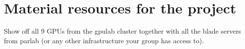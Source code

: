 \section{Material resources for the project}
Show off all 9 GPUs from the gpulab cluster together with all the blade servers from parlab (or any other infrastructure your group has access to).